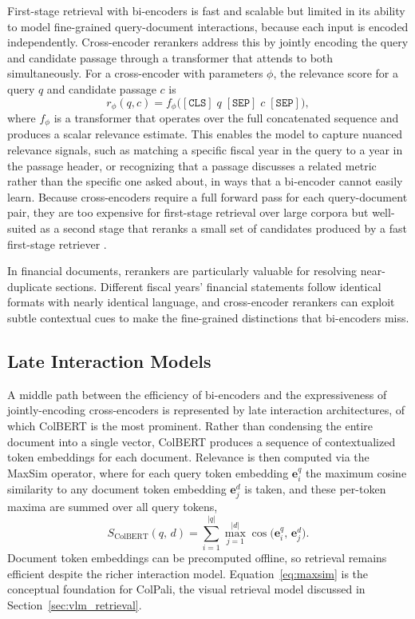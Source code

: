 \documentclass[12pt,twoside,maitrise]{dms}
\theoremstyle{definition}
\numberwithin{equation}{section}
\numberwithin{table}{chapter}
\numberwithin{figure}{chapter}
\begin{document}
First-stage retrieval with bi-encoders is fast and scalable but limited in its ability
to model fine-grained query-document interactions, because each input is encoded
independently. Cross-encoder rerankers address this by jointly encoding the query and
candidate passage through a transformer that attends to both simultaneously. For a
cross-encoder with parameters $\phi$, the relevance score for a query $q$ and candidate
passage $c$ is
\begin{equation}
  r_\phi(q, c) = f_\phi\!\bigl([\texttt{CLS}]\; q\; [\texttt{SEP}]\; c\; [\texttt{SEP}]\bigr),
\end{equation}
where $f_\phi$ is a transformer that operates over the full concatenated sequence and
produces a scalar relevance estimate. This enables the model to capture nuanced relevance
signals, such as matching a specific fiscal year in the query to a year in the passage
header, or recognizing that a passage discusses a related metric rather than the specific
one asked about, in ways that a bi-encoder cannot easily learn. Because cross-encoders
require a full forward pass for each query-document pair, they are too expensive for
first-stage retrieval over large corpora but well-suited as a second stage that reranks
a small set of candidates produced by a fast first-stage retriever \citep{nogueira2019document}.

In financial documents, rerankers are particularly valuable for resolving near-duplicate
sections. Different fiscal years' financial statements follow identical formats with
nearly identical language, and cross-encoder rerankers can exploit subtle contextual
cues to make the fine-grained distinctions that bi-encoders miss.

\subsection{Late Interaction Models}

A middle path between the efficiency of bi-encoders and the expressiveness of
jointly-encoding cross-encoders is represented by late interaction architectures, of
which ColBERT \citep{khattab2020colbert} is the most prominent. Rather than condensing
the entire document into a single vector, ColBERT produces a sequence of contextualized
token embeddings for each document. Relevance is then computed via the MaxSim operator,
where for each query token embedding $\mathbf{e}^q_i$ the maximum cosine similarity to
any document token embedding $\mathbf{e}^d_j$ is taken, and these per-token maxima are
summed over all query tokens,
\begin{equation}
  S_{\text{ColBERT}}(q,\, d) =
  \sum_{i=1}^{|q|} \max_{j=1}^{|d|} \cos\!\bigl(\mathbf{e}^q_i,\, \mathbf{e}^d_j\bigr).
  \label{eq:maxsim}
\end{equation}
Document token embeddings can be precomputed offline, so retrieval remains efficient
despite the richer interaction model. Equation~\eqref{eq:maxsim} is the conceptual
foundation for ColPali, the visual retrieval model discussed in
Section~\ref{sec:vlm_retrieval}.
\end{document}
